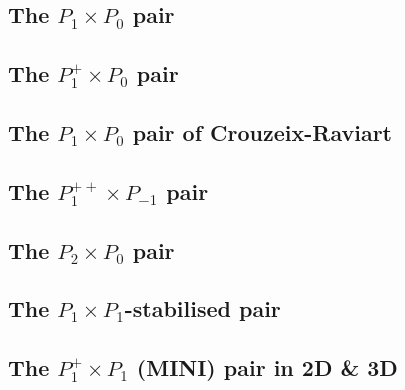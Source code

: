 

\subsection{The $P_1\times P_0$ pair} \label{ss:p1p0}


\subsection{The $P_1^+\times P_0$ pair} \label{ss:p1pp0}


\subsection{The $P_1 \times P_{0}$ pair of Crouzeix-Raviart} \label{sec:crouzeix-raviart1}


\subsection{The ${ P}_1^{++}\times P_{-1}$ pair} \label{ss:p1ppp1}


\subsection{The ${ P}_2\times P_0$ pair} \label{ss:p2p0}


\subsection{The ${ P}_1\times P_1$-stabilised pair} \label{ss:P1P1stab}


\subsection{The ${ P}_1^+\times P_1$ (MINI) pair in 2D \& 3D \label{pair:mini}}


